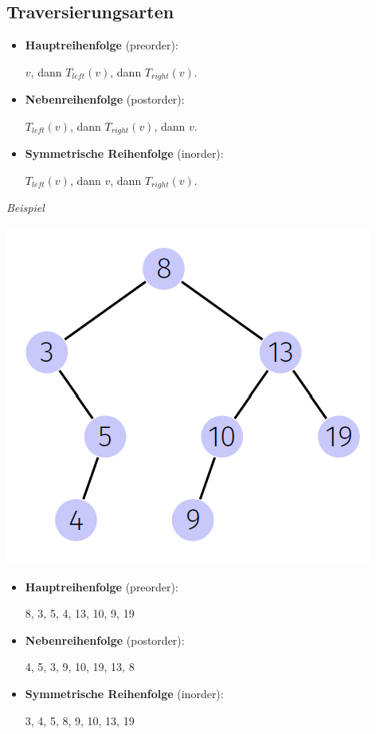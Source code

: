   \begin{sectionbox}
  \subsection{Traversierungsarten}\smallskip
  \begin{greenbox}
  \begin{itemize}
      \item \textbf{Hauptreihenfolge} (preorder):
      \par $v$, dann $T_{left}(v)$, dann $T_{right}(v)$.
      \item \textbf{Nebenreihenfolge} (postorder):
      \par $T_{left}(v)$, dann $T_{right}(v)$, dann $v$.
      \item \textbf{Symmetrische Reihenfolge} (inorder):
      \par $T_{left}(v)$, dann $v$, dann $T_{right}(v)$.
  \end{itemize}
  \end{greenbox}\smallskip
\end{sectionbox}
\vspace{-4pt}
\begin{sectionbox}
  \textit{Beispiel}\par
  \includegraphics[width = 0.4\columnwidth]{../img/BspBST.png}
  \smallskip
  \begin{itemize}
      \item \textbf{Hauptreihenfolge} (preorder):
      \par 8, 3, 5, 4, 13, 10, 9, 19
      \item \textbf{Nebenreihenfolge} (postorder):
      \par 4, 5, 3, 9, 10, 19, 13, 8
      \item \textbf{Symmetrische Reihenfolge} (inorder):
      \par 3, 4, 5, 8, 9, 10, 13, 19
  \end{itemize}
\end{sectionbox}


